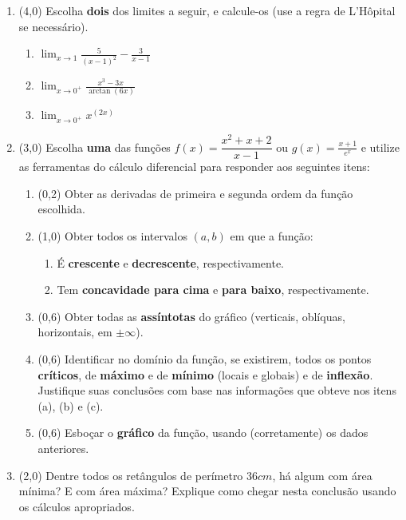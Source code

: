 \documentclass[12pt,a4paper]{article}
\begin{document}
\begin{enumerate}
\item (4,0) Escolha \textbf{dois} dos limites a seguir, e calcule-os (use a regra de L'Hôpital se necessário).
\begin{multicols}{3}
\begin{enumerate}
\item $\displaystyle\lim_{x\to 1} \frac{5}{(x-1)^2}-\frac{3}{x-1}$
\item $\displaystyle\lim_{x\to 0^+} \frac{x^3-3x}{\arctan(6x)}$
\item $\displaystyle\lim_{x\to 0^+} x^{(2x)}$
\end{enumerate}
\end{multicols}


\item (3,0) Escolha \textbf{uma} das funções $\displaystyle f(x) =\dfrac{x^2 + x + 2}{x-1}$ ou $\displaystyle g(x) = \frac{x+1}{e^x}$ e utilize as ferramentas do cálculo diferencial para responder aos seguintes itens:
\begin{enumerate}
\item (0,2) Obter as derivadas de primeira e segunda ordem da função escolhida.
\item (1,0) Obter todos os intervalos $(a,b)$ em que a função:
\begin{enumerate}
\item É \textbf{crescente} e \textbf{decrescente}, respectivamente.
\item Tem \textbf{concavidade para cima} e \textbf{para baixo}, respectivamente.
\end{enumerate}
\item (0,6) Obter todas as \textbf{assíntotas} do gráfico (verticais, oblíquas, horizontais, em $\pm \infty$).
\item (0,6) Identificar no domínio da função, se existirem, todos os pontos \textbf{críticos}, de \textbf{máximo} e de \textbf{mínimo} (locais e globais) e de \textbf{inflexão}. Justifique suas conclusões com base nas informações que obteve nos itens (a), (b) e (c).
\item (0,6) Esboçar o \textbf{gráfico} da função, usando (corretamente) os dados anteriores.
\end{enumerate}

\item (2,0) Dentre todos os retângulos de perímetro $36 cm$, há algum com área mínima? E com área máxima? Explique como chegar nesta conclusão usando os cálculos apropriados.


\end{enumerate}
\end{document}
